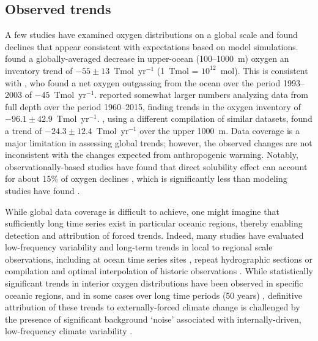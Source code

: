 \documentclass{report_chapter}
\begin{document}
\subsection{Observed trends}\label{loc:obs-tr}

A few studies have examined oxygen distributions on a global scale and found declines that appear consistent with expectations based on model simulations.
\citet{Helm-Bindoff-etal-2011} found a globally-averaged decrease in upper-ocean (100--1000~m) oxygen an inventory trend of $-55 \pm 13$~Tmol~yr$^{-1}$ (1~Tmol = $10^{12}$~mol).
This is consistent with \citet{Manning-Keeling-2006}, who found a net oxygen outgassing from the ocean over the period  1993--2003 of $-45$~Tmol~yr$^{-1}$.
\citet{Schmidtko-Stramma-etal-2017} reported somewhat larger numbers analyzing data from full depth over the period 1960--2015, finding trends in the oxygen inventory of $-96.1\pm42.9$~Tmol~yr$^{-1}$.
\citet{Ito-Minobe-etal-2017}, using a different compilation of similar datasets, found a trend of $-24.3\pm12.4$~Tmol~yr$^{-1}$ over the upper 1000~m.
Data coverage is a major limitation in assessing global trends; however, the observed changes are not inconsistent with the changes expected from anthropogenic warming.
Notably, observationally-based studies have found that direct solubility effect can account for about 15\% of oxygen declines \citep{Helm-Bindoff-etal-2011,Schmidtko-Stramma-etal-2017}, which is significantly less than modeling studies have found \citep[e.g.,][]{Bopp-Quere-etal-2002}.

While global data coverage is difficult to achieve, one might imagine that sufficiently long time series exist in particular oceanic regions, thereby enabling detection and attribution of forced trends.
Indeed, many studies have evaluated low-frequency variability and long-term trends in local to regional scale \OO{} observations, including at ocean time series sites \citep[e.g.,][]{Ono-Midorikawa-etal-2001,Andreev-Baturina-2006,Whitney-Freeland-etal-2007,McClatchie-Goericke-etal-2010}, repeat hydrographic sections \citep[e.g.,][]{Emerson-Watanabe-etal-2004,Johnson-Gruber-2007,Mecking-Langdon-etal-2008,van-Aken-Femke-de-Jong-etal-2011,Sasano-Takatani-etal-2015} or compilation and optimal interpolation of historic observations \citep[e.g.,][]{Stramma-Johnson-etal-2008,Helm-Bindoff-etal-2011,Stendardo-Gruber-2012}.
While statistically significant trends in interior oxygen distributions have been observed in specific oceanic regions, and in some cases over long time periods (50 years) \citep{Stendardo-Gruber-2012}, definitive attribution of these trends to externally-forced climate change is challenged by the presence of significant background `noise' associated with internally-driven, low-frequency climate variability \citep{Garcia-Boyer-etal-2005,Ito-Deutsch-2010}.
\end{document}
